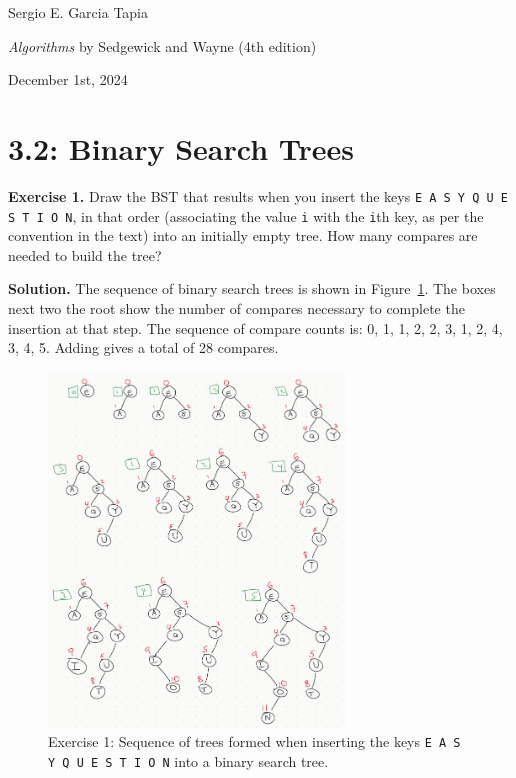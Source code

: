\documentclass[12pt, a4paper]{article}
\newenvironment{ex}[2][Exercise]
{\par\medskip\noindent \textbf{#1 #2.}}
{\medskip}
\newenvironment{sol}[1][Solution]
{\par\medskip\noindent \textbf{#1.} }
{\medskip}
\begin{document}
	\noindent Sergio E. Garcia Tapia \hfill
	
	\noindent \emph{Algorithms} by Sedgewick and Wayne (4th edition) \cite{sedgewick_wayne}\hfill
	
	\noindent December 1st, 2024\hfill 
	\section*{3.2: Binary Search Trees}
	\begin{ex}{1}
		Draw the BST that results when you insert the keys \texttt{E A S Y Q U E S T I O N},
		in that order (associating the value \texttt{i} with the \texttt{i}th key, as per the
		convention in the text) into an initially empty tree. How many compares are needed
		to build the tree?
	\end{ex}
	\begin{sol}
		The sequence of binary search trees is shown in Figure~\ref{fig:ex-01}. The boxes next
		two the root show the number of compares necessary to complete the insertion at
		that step. The sequence of compare counts is: 0, 1, 1, 2, 2, 3, 1, 2, 4, 3, 4, 5.
		Adding gives a total of 28 compares.
		\begin{figure}
			\centering
			\includegraphics[width=0.7\textwidth]{exercise-01}
			\caption{Exercise 1: Sequence of trees formed when inserting the keys \texttt{E A S Y Q U E S T I O N}
			into a binary search tree.}
			\label{fig:ex-01}
		\end{figure}
	\end{sol}
\end{document}
